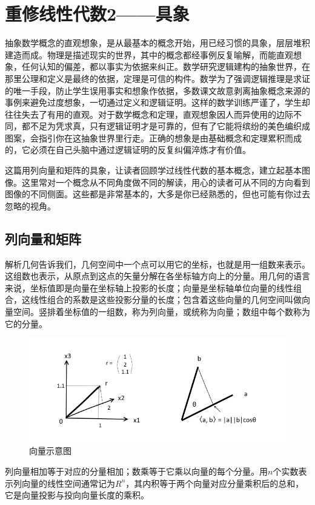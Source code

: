 
\chapter{重修线性代数2——具象}
抽象数学概念的直观想象，是从最基本的概念开始，用已经习惯的具象，层层堆积建造而成。物理是描述现实的世界，其中的概念都经事例反复喻解，而能直观想象，任何认知的偏差，都以事实为依据来纠正。数学研究逻辑建构的抽象世界，在那里公理和定义是最终的依据，定理是可信的构件。数学为了强调逻辑推理是求证的唯一手段，防止学生误用事实和想象作依据，多数课文故意剥离抽象概念来源的事例来避免过度想象，一切通过定义和逻辑证明。这样的数学训练严谨了，学生却往往失去了有用的直观。对于数学概念和定理，直观想象因人而异使用的边际不同，都不足为凭求真，只有逻辑证明才是可靠的，但有了它能将缤纷的美色编织成图案，会指引你在这抽象世界里行走。正确的想象是由基础概念和定理累积而成的，它必须在自己头脑中通过逻辑证明的反复纠偏淬炼才有价值。

这篇用列向量和矩阵的具象，让读者回顾学过线性代数的基本概念，建立起基本图像。这里常对一个概念从不同角度做不同的解读，用心的读者可从不同的方向看到图像的不同侧面。这些都是非常基本的，大多是你已经熟悉的，但也可能有你过去忽略的视角。
\section{列向量和矩阵}
解析几何告诉我们，几何空间中一个点可以用它的坐标，也就是用一组数来表示。这组数也表示，从原点到这点的矢量分解在各坐标轴方向上的分量。用几何的语言来说，坐标值即是向量在坐标轴上投影的长度；向量是坐标轴单位向量的线性组合，这线性组合的系数是这些投影分量的长度；包含着这些向量的几何空间叫做向量空间。竖排着坐标值的一组数，称为列向量，或统称为向量；数组中每个数称为它的分量。

\begin{figure}[h]
	\centering
	\includegraphics[width=0.7\linewidth]{pic/153404gr2s818g3sg3g1h9.png}
	\caption{向量示意图}
	\label{fig:153404gr2s818g3sg3g1h9}
\end{figure}


列向量相加等于对应的分量相加；数乘等于它乘以向量的每个分量。用$ n $个实数表示列向量的线性空间通常记为$ R^n $，其内积等于两个向量对应分量乘积后的总和，它是向量投影与投向向量长度的乘积。

